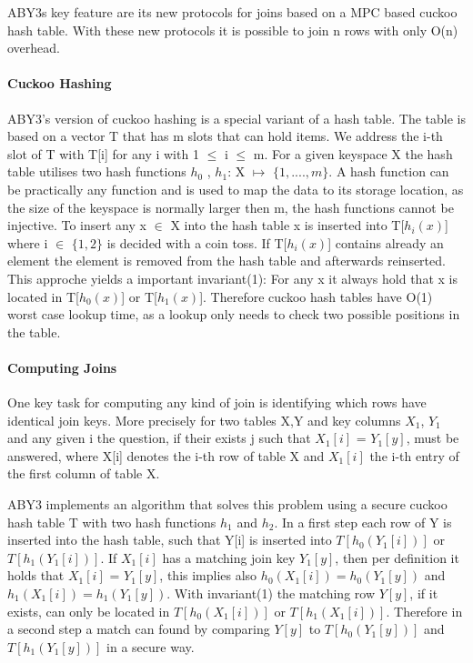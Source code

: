  
ABY3s key feature are its new protocols for joins based on a MPC based cuckoo hash table. With these new protocols it is possible to join n rows with only O(n) overhead.



\paragraph{ Cuckoo Hashing }
ABY3's version of cuckoo hashing is a special variant of a hash table. The table is based on a vector T that has m slots that can hold items. We address the i-th slot of T with T[i] for any i with 1 $\leq$ i $ \leq $ m. For a given keyspace X the hash table utilises two hash functions $ h_0 $ , $ h_1 $: X $ \mapsto $   $ \{ 1,....,m \} $. A hash function can be practically any function and is used to map the data to its storage location, as the size of the keyspace is normally larger then m, the hash functions cannot be injective.
To insert any x $ \in $ X into the hash table x is inserted into T[$h_i(x)$] where i $ \in $ $ \{ 1,2 \} $ is decided with a coin toss. If T[$h_i(x)$] contains already an element the element is removed from the hash table and afterwards reinserted. This approche yields a important invariant(1): For any x it always hold that x is located in T[$h_0(x)$] or T[$h_1(x)$]. Therefore cuckoo hash tables have O(1) worst case lookup time, as a lookup only needs to check two possible positions in the table. 
\paragraph{Computing Joins}
One key task for computing any kind of join is identifying which rows have identical join keys. More precisely for two tables X,Y and key columns $X_1$, $Y_1$ and any given i the question, if their exists j such that $X_1[i]$ = $Y_1[y]$, must be answered, where X[i] denotes the i-th row of table X and $ X_1[i] $ the i-th entry of the first column of table X. 

ABY3 implements an algorithm that solves this problem using a secure cuckoo hash table T with two hash functions $ h_1 $ and $h_2$. 
In a first step each row of Y is inserted into the hash table, such that Y[i] is inserted into $ T[h_0(Y_1 [i]  )] $ or $T[h_1(Y_1 [i]  )] $. 
If $X_1[i]$ has a matching join key $Y_1[y]$, then per definition it holds that  $X_1[i]$ = $Y_1[y]$, this implies also $ h_0(X_1[i]) = h_0(Y_1[y])$ and $ h_1(X_1[i]) = h_1(Y_1[y])$. With invariant(1) the matching row $Y[y]$, if it exists, can only be located in $ T[h_0(X_1[i])] $ or $T[h_1( X_1[i])] $. 
Therefore in a second step a match can found by comparing $Y[y]$ to $ T[h_0(Y_1[y])] $ and $T[h_1(Y_1[y])] $ in a secure way. 

